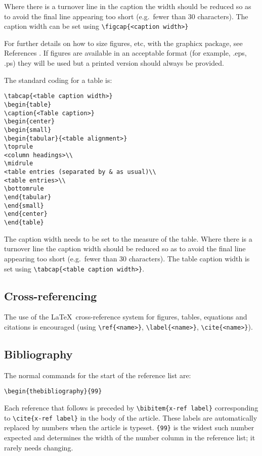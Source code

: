 \documentclass{nmeauth}
\begin{document}
Where there is a turnover line in the caption the width should be reduced so as
to avoid the final line appearing too short (e.g.\ fewer than 30 characters).
The caption width can be set using \verb"\figcap{<caption width>}"

For further details on how to size figures, etc,
with the \textsf{graphicx} package, see References \cite{Companion,KopkaDaly}.
If figures are available in an acceptable format (for example, .eps, .ps)
they will be used but a printed version should always be provided.
\mb

The standard coding for a table is:
\begin{verbatim}
\tabcap{<table caption width>}
\begin{table}
\caption{<Table caption>}
\begin{center}
\begin{small}
\begin{tabular}{<table alignment>}
\toprule
<column headings>\\
\midrule
<table entries (separated by & as usual)\\
<table entries>\\
\bottomrule
\end{tabular}
\end{small}
\end{center}
\end{table}
\end{verbatim}

The caption width needs to be set to the measure of the table. Where there
is a turnover line the caption width should be reduced so as to avoid the
final line appearing too short (e.g.\ fewer than 30 characters). The table
caption width is set using \verb"\tabcap{<table caption width>}".

\subsection{Cross-referencing}
The use of the \LaTeX\ cross-reference system
for figures, tables, equations and citations is encouraged
(using \verb"\ref{<name>}", \verb"\label{<name>}", \verb"\cite{<name>}").

\subsection{Bibliography}
The normal commands for the start of the reference list are:
\begin{verbatim}
\begin{thebibliography}{99}
\end{verbatim}
Each reference that follows is preceded by \verb"\bibitem{x-ref label}"
corresponding to \verb"\cite{x-ref label}" in the body of the article.
These labels are automatically replaced by numbers when the article
is typeset.  \verb"{99}" is the widest such number expected and determines
the width of the number column in the reference list; it rarely needs changing.
\end{document}

